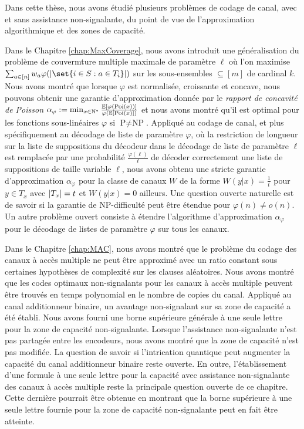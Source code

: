 Dans cette thèse, nous avons étudié plusieurs problèmes de codage de canal, avec et sans assistance non-signalante, du point de vue de l'approximation algorithmique et des zones de capacité.

Dans le Chapitre \ref{chap:MaxCoverage}, nous avons introduit une généralisation du problème de couvermture multiple maximale de paramètre $\ell$ où l'on maximise $\sum_{a \in [n]} w_a\varphi(\abs{\set{i \in S : a \in T_i}})$ sur les sous-ensembles $\subseteq [m]$ de cardinal $k$. Nous avons montré que lorsque $\varphi$ est normalisée, croissante et concave, nous pouvons obtenir une garantie d'approximation donnée par le \emph{rapport de concavité de Poisson} $\alpha_{\varphi} := \min_{x \in \mathbb{N}^*} \frac{\mathbb{E}[\varphi(\operatorname{\text{Poi}}(x))]}{\varphi(\mathbb{E}[\operatorname{\text{Poi}}(x)])}$ et nous avons montré qu'il est optimal pour les fonctions sous-linéaires $\varphi$ si $\textrm{P}\not=\textrm{NP}$. Appliqué au codage de canal, et plus spécifiquement au décodage de liste de paramètre $\varphi$, où la restriction de longueur sur la liste de suppositions du décodeur dans le décodage de liste de paramètre $\ell$ est remplacée par une probabilité $\frac{\varphi(\ell)}{\ell}$ de décoder correctement une liste de suppositions de taille variable $\ell$, nous avons obtenu une stricte garantie d'approximation $\alpha_{\varphi}$ pour la classe de canaux $W$ de la forme $W(y|x) = \frac{1}{t}$ pour $y \in T_x$ avec $\abs{T_x}=t$ et $W(y|x) = 0$ ailleurs. Une question ouverte naturelle est de savoir si la garantie de \textrm{NP}-difficulté peut être étendue pour $\varphi(n) \not= o(n)$. Un autre problème ouvert consiste à étendre l'algorithme d'approximation $\alpha_{\varphi}$ pour le décodage de listes de paramètre $\varphi$ sur tous les canaux.

Dans le Chapitre \ref{chap:MAC}, nous avons montré que le problème du codage des canaux à accès multiple ne peut être approximé avec un ratio constant sous certaines hypothèses de complexité sur les clauses aléatoires. Nous avons montré que les codes optimaux non-signalants pour les canaux à accès multiple peuvent être trouvés en temps polynomial en le nombre de copies du canal. Appliqué au canal additionneur binaire, un avantage non-signalant sur sa zone de capacité a été établi. Nous avons fourni une borne supérieure générale à une seule lettre pour la zone de capacité non-signalante. Lorsque l'assistance non-signalante n'est pas partagée entre les encodeurs, nous avons montré que la zone de capacité n'est pas modifiée. La question de savoir si l'intrication quantique peut augmenter la capacité du canal additionneur binaire reste ouverte. En outre, l'établissement d'une formule à une seule lettre pour la capacité avec assistance non-signalante des canaux à accès multiple reste la principale question ouverte de ce chapitre. Cette dernière pourrait être obtenue en montrant que la borne supérieure à une seule lettre fournie pour la zone de capacité non-signalante peut en fait être atteinte.

